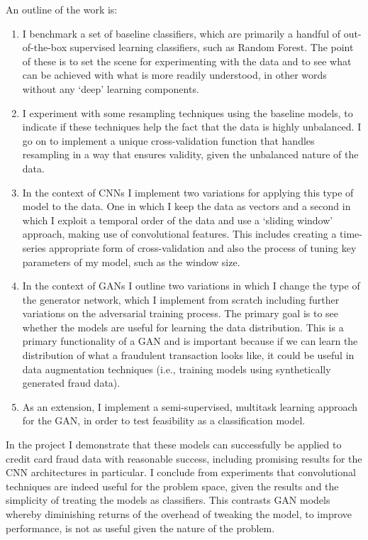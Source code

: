 \documentclass[12pt,a4paper,twoside]{report}
\begin{document}
An outline of the work is:
\begin{enumerate}
\item I benchmark a set of baseline classifiers, which are primarily a handful of out-of-the-box supervised learning classifiers, such as Random Forest. The point of these is to set the scene for experimenting with the data and to see what can be achieved with what is more readily understood, in other words without any `deep' learning components.

\item I experiment with some resampling techniques using the baseline models, to indicate if these techniques help the fact that the data is highly unbalanced. I go on to implement a unique cross-validation function that handles resampling in a way that ensures validity, given the unbalanced nature of the data.

\item In the context of CNNs I implement two variations for applying this type of model to the data. One in which I keep the data as vectors and a second in which I exploit a temporal order of the data and use a `sliding window' approach, making use of convolutional features. This includes creating a time-series appropriate form of cross-validation and also the process of tuning key parameters of my model, such as the window size.

\item In the context of GANs I outline two variations in which I change the type of the generator network, which I implement from scratch including further variations on the adversarial training process. The primary goal is to see whether the models are useful for learning the data distribution. This is a primary functionality of a GAN and is important because if we can learn the distribution of what a fraudulent transaction looks like, it could be useful in data augmentation techniques (i.e., training models using synthetically generated fraud data).  

\item As an extension, I implement a semi-supervised, multitask learning approach for the GAN, in order to test feasibility as a classification model. 

\end{enumerate}

In the project I demonstrate that these models can successfully be applied to credit card fraud data with reasonable success, including promising results for the CNN architectures in particular. I conclude from experiments that convolutional techniques are indeed useful for the problem space, given the results and the simplicity of treating the models as classifiers. This contrasts GAN models whereby diminishing returns of the overhead of tweaking the model, to improve performance, is not as useful given the nature of the problem.
\end{document}
